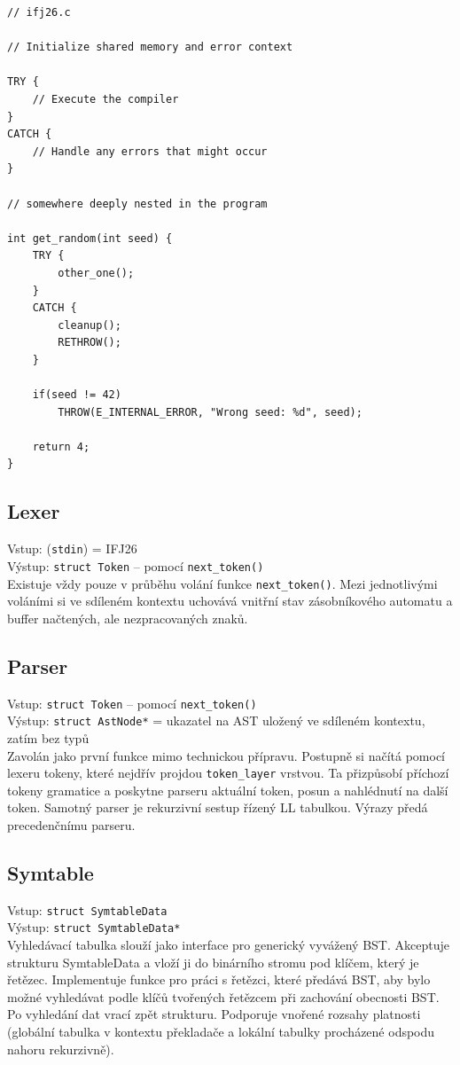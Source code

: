 \documentclass[11pt,a4paper]{article}
\begin{document}
\vfill

\begin{lstlisting}[style=cstyle]
// ifj26.c

// Initialize shared memory and error context

TRY {
    // Execute the compiler
}
CATCH {
    // Handle any errors that might occur
}

// somewhere deeply nested in the program

int get_random(int seed) {
    TRY {
        other_one();
    }
    CATCH {
        cleanup();
        RETHROW();
    }

    if(seed != 42)
        THROW(E_INTERNAL_ERROR, "Wrong seed: %d", seed);

    return 4;
}
\end{lstlisting}

\subsection{Lexer}
Vstup: (\verb|stdin|) = IFJ26 \\
Výstup: \verb|struct Token| -- pomocí \verb|next_token()| \\
Existuje vždy pouze v průběhu volání funkce \verb|next_token()|. Mezi jednotlivými voláními si ve sdíleném kontextu uchovává vnitřní stav zásobníkového automatu a buffer načtených, ale nezpracovaných znaků.

\subsection{Parser}
Vstup: \verb|struct Token| -- pomocí \verb|next_token()| \\
Výstup: \verb|struct AstNode*| = ukazatel na AST uložený ve sdíleném kontextu, zatím bez typů \\
Zavolán jako první funkce mimo technickou přípravu. Postupně si načítá pomocí lexeru tokeny, které nejdřív projdou \texttt{token\_layer} vrstvou.
Ta přizpůsobí příchozí tokeny gramatice a poskytne parseru aktuální token, posun a nahlédnutí na další token.
Samotný parser je rekurzivní sestup řízený LL tabulkou. Výrazy předá precedenčnímu parseru.

\subsection{Symtable}
Vstup: \verb|struct SymtableData| \\
Výstup: \verb|struct SymtableData*| \\
Vyhledávací tabulka slouží jako interface pro generický vyvážený BST. Akceptuje strukturu SymtableData a vloží ji do binárního stromu pod klíčem, který je řetězec. Implementuje funkce pro práci s řetězci, které předává BST, aby bylo možné vyhledávat podle klíčů tvořených řetězcem při zachování obecnosti BST. Po vyhledání dat vrací zpět strukturu. Podporuje vnořené rozsahy platnosti (globální tabulka v kontextu překladače a lokální tabulky procházené odspodu nahoru rekurzivně).
\end{document}
